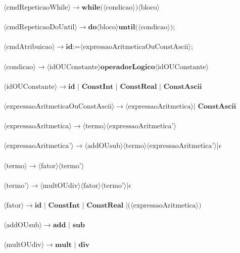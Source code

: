 \documentclass[11pt]{article}
\begin{document}
$\langle\text{cmdRepeticaoWhile}\rangle \rightarrow \textbf{while(} \langle\text{condicao}\rangle \textbf{)} \langle\text{bloco}\rangle $\\\\
$\langle\text{cmdRepeticaoDoUntil}\rangle \rightarrow \textbf{do} \langle\text{bloco}\rangle \textbf{until(} \langle\text{condicao}\rangle \textbf{)} \textbf{;}$\\\\
$\langle\text{cmdAtribuicao}\rangle \rightarrow  \textbf{id} \textbf{:=} \langle\text{expressaoAritmeticaOuConstAscii}\rangle \textbf{;} $\\\\
$\langle\text{condicao}\rangle \rightarrow  \langle\text{idOUConstante}\rangle \textbf{operadorLogico} \langle\text{idOUConstante}\rangle $\\\\%
$\langle\text{idOUConstante}\rangle \rightarrow  \textbf{id }|  \textbf{ ConstInt } | \textbf{ ConstReal } | \textbf{ ConstAscii}$\\\\
$\langle\text{expressaoAritmeticaOuConstAscii}\rangle \rightarrow \langle\text{expressaoAritmetica}\rangle | \textbf{ ConstAscii}$\\\\
$\langle\text{expressaoAritmetica}\rangle \rightarrow  \langle\text{termo}\rangle \langle\text{expressaoAritmetica'}\rangle$\\\\
$\langle\text{expressaoAritmetica'}\rangle \rightarrow \langle\text{addOUsub}\rangle \langle\text{termo}\rangle \langle\text{expressaoAritmetica'}\rangle | \epsilon $\\\\
$\langle\text{termo}\rangle \rightarrow \langle\text{fator}\rangle \langle\text{termo'}\rangle $\\\\
$\langle\text{termo'}\rangle \rightarrow \langle\text{multOUdiv}\rangle \langle\text{fator}\rangle \langle\text{termo'}\rangle | \epsilon $\\\\
$\langle\text{fator}\rangle \rightarrow \textbf{id }| \textbf{ ConstInt } | \textbf{ ConstReal } | \textbf{(} \langle\text{expressaoAritmetica}\rangle  \textbf{)} $\\\\
$\langle\text{addOUsub}\rangle \rightarrow  \textbf{add } | \textbf{ sub}$ \\\\
$\langle\text{multOUdiv}\rangle \rightarrow  \textbf{mult } | \textbf{ div}$ \\\\
\end{document}

